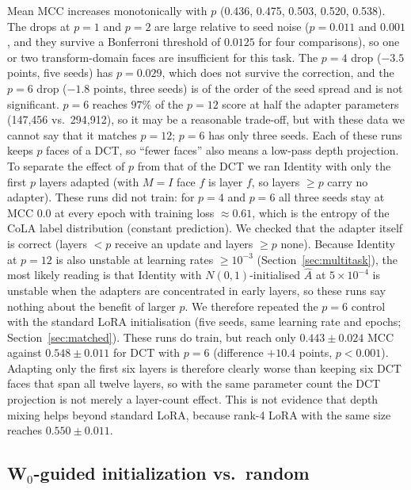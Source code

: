 \documentclass{article}
\theoremstyle{plain}
\begin{document}
\noindent
Mean MCC increases monotonically with $p$ (0.436, 0.475, 0.503, 0.520, 0.538).
The drops at $p=1$ and $p=2$ are large relative to seed noise ($p=0.011$ and $0.001$, and they survive a Bonferroni threshold of
$0.0125$ for four comparisons), so one or two transform-domain faces are insufficient for this task.
The $p=4$ drop ($-3.5$ points, five seeds) has $p=0.029$, which does not survive the correction, and the $p=6$ drop
($-1.8$ points, three seeds) is of the order of the seed spread and is not significant.
$p=6$ reaches $97\%$ of the $p=12$ score at half the adapter parameters (147,456 vs.\ 294,912), so it may be a reasonable
trade-off, but with these data we cannot say that it matches $p=12$; $p=6$ has only three seeds.
Each of these runs keeps $p$ faces of a DCT, so ``fewer faces'' also means a low-pass depth projection.
To separate the effect of $p$ from that of the DCT we ran Identity with only the first $p$ layers adapted (with $M=I$ face $f$ is layer $f$, so layers $\ge p$ carry no adapter).
These runs did not train: for $p=4$ and $p=6$ all three seeds stay at MCC $0.0$ at every epoch with training loss $\approx0.61$,
which is the entropy of the CoLA label distribution (constant prediction).
We checked that the adapter itself is correct (layers $<p$ receive an update and layers $\ge p$ none).
Because Identity at $p=12$ is also unstable at learning rates $\ge10^{-3}$ (Section~\ref{sec:multitask}), the most likely reading is that
Identity with $N(0,1)$-initialised $\hat A$ at $5\times10^{-4}$ is unstable when the adapters are concentrated in early layers, so these runs say nothing about the benefit of larger $p$.
We therefore repeated the $p=6$ control with the standard LoRA initialisation (five seeds, same learning rate and epochs; Section~\ref{sec:matched}).
These runs do train, but reach only $0.443\pm0.024$ MCC against $0.548\pm0.011$ for DCT with $p=6$ (difference $+10.4$ points, $p<0.001$).
Adapting only the first six layers is therefore clearly worse than keeping six DCT faces that span all twelve layers, so with the same parameter count
the DCT projection is not merely a layer-count effect. This is not evidence that depth mixing helps beyond standard LoRA, because rank-4 LoRA with the same size reaches $0.550\pm0.011$.

\subsection{W\texorpdfstring{$_0$}{0}-guided initialization vs.\ random}
\label{sec:init_comparison}
\end{document}
